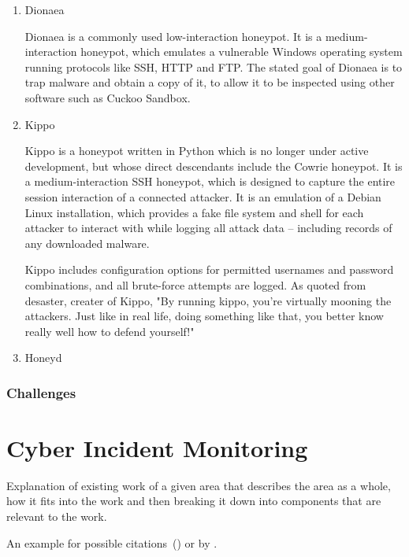 \begin{enumerate}
\begin{itemize}
\end{itemize}

\item Dionaea

Dionaea is a commonly used low-interaction honeypot. It is a medium-interaction honeypot, which emulates a vulnerable Windows operating system running protocols like SSH, HTTP and FTP. The stated goal of Dionaea is to trap malware and obtain a copy of it, to allow it to be inspected using other software such as Cuckoo Sandbox.

\item Kippo

Kippo is a honeypot written in Python which is no longer under active development, but whose direct descendants include the Cowrie honeypot. It is a medium-interaction SSH honeypot, which is designed to capture the entire session interaction of a connected attacker. It is an emulation of a Debian Linux installation, which provides a fake file system and shell for each attacker to interact with while logging all attack data – including records of any downloaded malware. 

Kippo includes configuration options for permitted usernames and password combinations, and all brute-force attempts are logged.
As quoted from desaster, creater of Kippo, "By running kippo, you're virtually mooning the attackers. Just like in real life, doing something like that, you better know really well how to defend yourself!"

\item Honeyd 

\end{enumerate}

\subsubsection{Challenges}

\section{Cyber Incident Monitoring}

Explanation of existing work of a given area that describes the area as a whole, how it fits into the work and then breaking it down into components that are relevant to the work.

An example for possible citations~(\cite{Andrew2013empirical}) or by \cite{Asghari2015Economics}.



